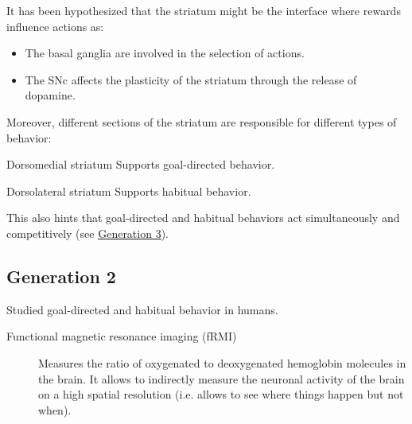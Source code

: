 It has been hypothesized that the striatum might be the interface where rewards influence actions as: 
\begin{itemize}
    \item The basal ganglia are involved in the selection of actions.
    \item The SNc affects the plasticity of the striatum through the release of dopamine.
\end{itemize}

Moreover, different sections of the striatum are responsible for different types of behavior:
\begin{descriptionlist}
    \item[Dorsomedial striatum] Supports goal-directed behavior.
    \item[Dorsolateral striatum] Supports habitual behavior.
\end{descriptionlist}
This also hints that goal-directed and habitual behaviors act simultaneously and competitively (see \hyperref[sec:instrumental_gen3]{Generation 3}).


\subsection{Generation 2} 

Studied goal-directed and habitual behavior in humans.

\begin{description}
    \item[Functional magnetic resonance imaging (fRMI)] 
        Measures the ratio of oxygenated to deoxygenated hemoglobin molecules in the brain.
        It allows to indirectly measure the neuronal activity of the brain on a high spatial resolution (i.e. allows to see where things happen but not when).
\end{description}

